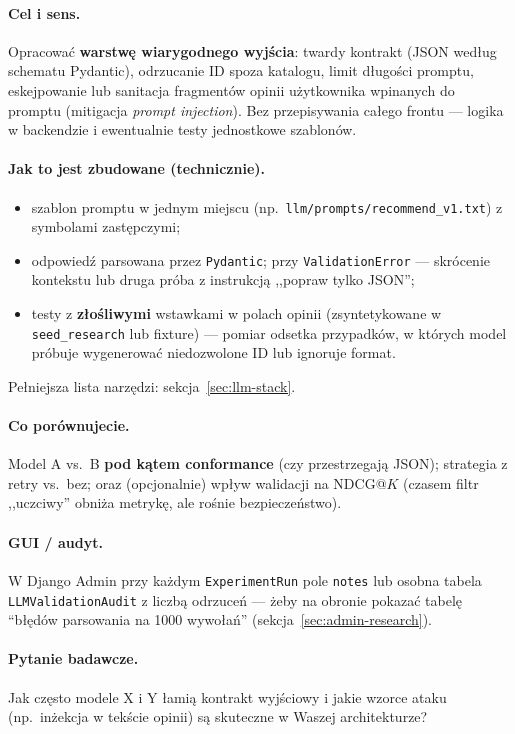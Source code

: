 \documentclass[a4paper,11pt]{article}
\newcommand{\code}[1]{\texttt{\small #1}}
\begin{document}
\paragraph{Cel i sens.}
Opracować \textbf{warstwę wiarygodnego wyjścia}: twardy kontrakt (JSON według schematu Pydantic), odrzucanie ID spoza katalogu, limit długości promptu, eskejpowanie lub sanitacja fragmentów opinii użytkownika wpinanych do promptu (mitigacja \emph{prompt injection}). Bez przepisywania całego frontu --- logika w backendzie i ewentualnie testy jednostkowe szablonów.

\paragraph{Jak to jest zbudowane (technicznie).}
\begin{itemize}[leftmargin=1.5em,itemsep=1pt]
  \item szablon promptu w jednym miejscu (np.\ \code{llm/prompts/recommend\_v1.txt}) z symbolami zastępczymi;
  \item odpowiedź parsowana przez \code{Pydantic}; przy \code{ValidationError} --- skrócenie kontekstu lub druga próba z instrukcją ,,popraw tylko JSON'';
  \item testy z \textbf{złośliwymi} wstawkami w polach opinii (zsyntetykowane w \texttt{seed\_research} lub fixture) --- pomiar odsetka przypadków, w których model próbuje wygenerować niedozwolone ID lub ignoruje format.
\end{itemize}
Pełniejsza lista narzędzi: sekcja~\ref{sec:llm-stack}.

\paragraph{Co porównujecie.}
Model A vs.\ B \textbf{pod kątem conformance} (czy przestrzegają JSON); strategia z retry vs.\ bez; oraz (opcjonalnie) wpływ walidacji na NDCG@$K$ (czasem filtr ,,uczciwy'' obniża metrykę, ale rośnie bezpieczeństwo).

\paragraph{GUI / audyt.}
W Django Admin przy każdym \code{ExperimentRun} pole \code{notes} lub osobna tabela \code{LLMValidationAudit} z liczbą odrzuceń --- żeby na obronie pokazać tabelę ``błędów parsowania na 1000 wywołań'' (sekcja~\ref{sec:admin-research}).

\paragraph{Pytanie badawcze.}
Jak często modele X i Y łamią kontrakt wyjściowy i jakie wzorce ataku (np.\ inżekcja w tekście opinii) są skuteczne w Waszej architekturze?
\end{document}
